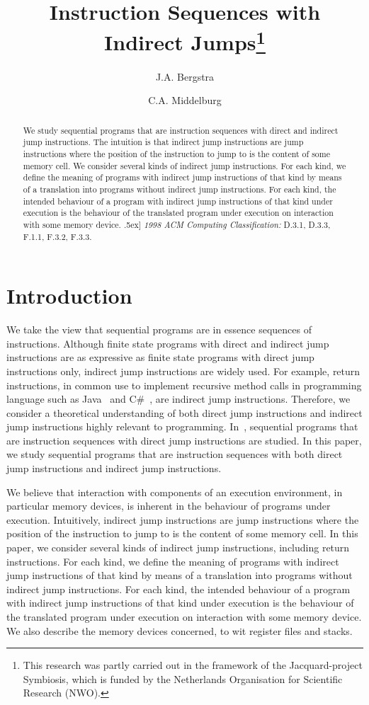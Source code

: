 \documentclass[fleqn]{llncs}
\title{Instruction Sequences with Indirect Jumps\thanks{This research was partly carried out in the framework of
               the  Jacquard-project Symbiosis, which is funded by the
               Netherlands Organisation for Scientific Research (NWO).}}
\author{J.A. Bergstra\inst{1}\fnmsep\inst{2}
        \and
        C.A. Middelburg\inst{1}
       }
\institute{Programming Research Group,
           University of Amsterdam, \\
           P.O.~Box~41882, 1009~DB~Amsterdam, the Netherlands \\
           \and
           Department of Philosophy,
           Utrecht University, \\
           P.O.~Box~80126, 3508~TC~Utrecht, the Netherlands \\
           \email{J.A.Bergstra@uva.nl,C.A.Middelburg@uva.nl}
          }
\begin{document}
\maketitle

\begin{abstract}
We study sequential programs that are instruction sequences with direct
and indirect jump instructions.
The intuition is that indirect jump instructions are jump instructions
where the position of the instruction to jump to is the content of some
memory cell.
We consider several kinds of indirect jump instructions.
For each kind, we define the meaning of programs with indirect jump
instructions of that kind by means of a translation into programs
without indirect jump instructions.
For each kind, the intended behaviour of a program with indirect jump
instructions of that kind under execution is the behaviour of the
translated program under execution on interaction with some memory
device.
\1.5ex]
{\sl 1998 ACM Computing Classification:}
D.3.1, D.3.3, F.1.1, F.3.2, F.3.3.
\end{abstract}

\section{Introduction}
\label{sect-intro}

We take the view that sequential programs are in essence sequences of
instructions.
Although finite state programs with direct and indirect jump
instructions are as expressive as finite state programs with direct jump
instructions only, indirect jump instructions are widely used.
For example, return instructions, in common use to implement recursive
method calls in programming language such as Java~\cite{GJSB00a} and
C\#~\cite{HWG03a}, are indirect jump instructions.
Therefore, we consider a theoretical understanding of both direct jump
instructions and indirect jump instructions highly relevant to
programming.
In~\cite{BL02a}, sequential programs that are instruction sequences with
direct jump instructions are studied.
In this paper, we study sequential programs that are instruction
sequences with both direct jump instructions and indirect jump
instructions.

We believe that interaction with components of an execution environment,
in particular memory devices, is inherent in the behaviour of programs
under execution.
Intuitively, indirect jump instructions are jump instructions where the
position of the instruction to jump to is the content of some memory
cell.
In this paper, we consider several kinds of indirect jump instructions,
including return instructions.
For each kind, we define the meaning of programs with indirect jump
instructions of that kind by means of a translation into programs
without indirect jump instructions.
For each kind, the intended behaviour of a program with indirect jump
instructions of that kind under execution is the behaviour of the
translated program under execution on interaction with some memory
device.
We also describe the memory devices concerned, to wit register files and
stacks.
\end{document}
